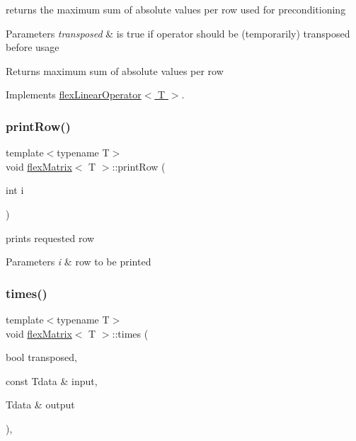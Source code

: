 returns the maximum sum of absolute values per row used for preconditioning 


\begin{DoxyParams}{Parameters}
{\em transposed} & is true if operator should be (temporarily) transposed before usage \\
\hline
\end{DoxyParams}
\begin{DoxyReturn}{Returns}
maximum sum of absolute values per row 
\end{DoxyReturn}


Implements \hyperlink{classflex_linear_operator_afcb74697385ccb7c8d29870d7034c12a}{flex\+Linear\+Operator$<$ T $>$}.

\mbox{\label{classflex_matrix_aafd59b0c2f60fbff0df13fd3888f1cf3}} 
\subsubsection{\texorpdfstring{print\+Row()}{printRow()}}
{\footnotesize\ttfamily template$<$typename T$>$ \\
void \hyperlink{classflex_matrix}{flex\+Matrix}$<$ T $>$\+::print\+Row (\begin{DoxyParamCaption}\item[{int}]{i }\end{DoxyParamCaption})\hspace{0.3cm}{\ttfamily [inline]}}



prints requested row 


\begin{DoxyParams}{Parameters}
{\em i} & row to be printed \\
\hline
\end{DoxyParams}
\mbox{\label{classflex_matrix_ac7e95eed2025202b252d804034b923b6}} 
\subsubsection{\texorpdfstring{times()}{times()}}
{\footnotesize\ttfamily template$<$typename T$>$ \\
void \hyperlink{classflex_matrix}{flex\+Matrix}$<$ T $>$\+::times (\begin{DoxyParamCaption}\item[{bool}]{transposed,  }\item[{const Tdata \&}]{input,  }\item[{Tdata \&}]{output }\end{DoxyParamCaption})\hspace{0.3cm}{\ttfamily [inline]}, {\ttfamily [virtual]}}



